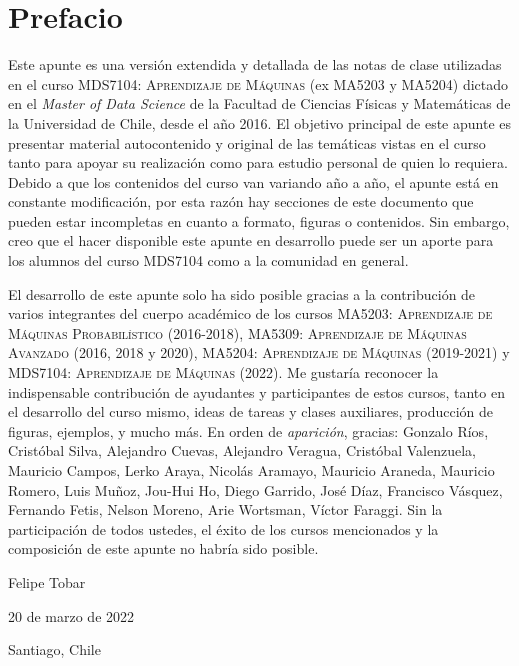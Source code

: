 \newpage
\section*{Prefacio}
Este apunte es una versión extendida y detallada de las notas de clase utilizadas en el curso \textsc{MDS7104: Aprendizaje de Máquinas} (ex MA5203 y MA5204) dictado en el \emph{Master of Data Science} de la Facultad de Ciencias Físicas y Matemáticas de la  Universidad de Chile, desde el año 2016. El objetivo principal de este apunte es presentar material autocontenido y original de las temáticas vistas en el curso tanto para apoyar su realización como para estudio personal de quien lo requiera. Debido a que los contenidos del curso van variando año a año, el apunte está en constante modificación, por esta razón hay secciones de este documento que pueden estar incompletas en cuanto a formato, figuras o contenidos. Sin embargo, creo que el hacer disponible este apunte en desarrollo puede ser un aporte para los alumnos del curso MDS7104 como a la comunidad en general.

El desarrollo de este apunte solo ha sido posible gracias a la contribución de varios integrantes del cuerpo académico de los cursos \textsc{MA5203: Aprendizaje de Máquinas Probabilístico} (2016-2018), \textsc{MA5309: Aprendizaje de Máquinas Avanzado} (2016, 2018 y 2020), \textsc{MA5204: Aprendizaje de Máquinas} (2019-2021) y \textsc{MDS7104: Aprendizaje de Máquinas} (2022). Me gustaría reconocer la indispensable contribución de ayudantes y participantes de estos cursos, tanto en el desarrollo del curso mismo, ideas de tareas y clases auxiliares, producción de figuras, ejemplos, y mucho más. En orden de \emph{aparición}, gracias: 
Gonzalo Ríos, 
Cristóbal Silva, 
Alejandro Cuevas, 
Alejandro Veragua, 
Cristóbal Valenzuela, 
Mauricio Campos, 
Lerko Araya, 
Nicolás Aramayo, 
Mauricio Araneda, 
Mauricio Romero, 
Luis Muñoz, 
Jou-Hui Ho, 
Diego Garrido, 
José Díaz, 
Francisco Vásquez, 
Fernando Fetis, 
Nelson Moreno, 
Arie Wortsman, 
Víctor Faraggi.
Sin la participación de todos ustedes, el éxito de los cursos mencionados y la composición de este apunte no habría sido posible.





\bigskip
\begin{flushright}
  Felipe Tobar\par
  20 de marzo de 2022\par
  Santiago, Chile
\end{flushright}
\newpage

